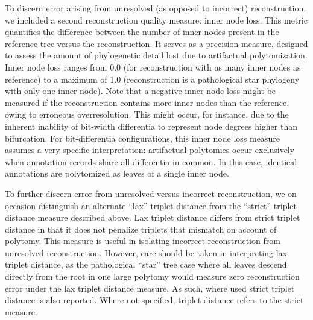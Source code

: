 To discern error arising from unresolved (as opposed to incorrect) reconstruction, we included a second reconstruction quality measure: inner node loss.
This metric quantifies the difference between the number of inner nodes present in the reference tree versus the reconstruction.
It serves as a precision measure, designed to assess the amount of phylogenetic detail lost due to artifactual polytomization.
Inner node loss ranges from 0.0 (for reconstruction with as many inner nodes as reference) to a maximum of 1.0 (reconstruction is a pathological star phylogeny with only one inner node).
Note that a negative inner node loss might be measured if the reconstruction contains more inner nodes than the reference, owing to erroneous overresolution.
This might occur, for instance, due to the inherent inability of bit-width differentia to represent node degrees higher than bifurcation.
For bit-differentia configurations, this inner node loss measure assumes a very specific interpretation: artifactual polytomies occur exclusively when annotation records share all differentia in common.
In this case, identical annotations are polytomized as leaves of a single inner node.

To further discern error from unresolved versus incorrect reconstruction, we on occasion distinguish an alternate ``lax'' triplet distance from the ``strict'' triplet distance measure described above.
Lax triplet distance differs from strict triplet distance in that it does not penalize triplets that mismatch on account of polytomy.
This measure is useful in isolating incorrect reconstruction from unresolved reconstruction.
However, care should be taken in interpreting lax triplet distance, as the pathological ``star'' tree case where all leaves descend directly from the root in one large polytomy would measure zero reconstruction error under the lax triplet distance measure.
As such, where used strict triplet distance is also reported.
Where not specified, triplet distance refers to the strict measure.

% 

